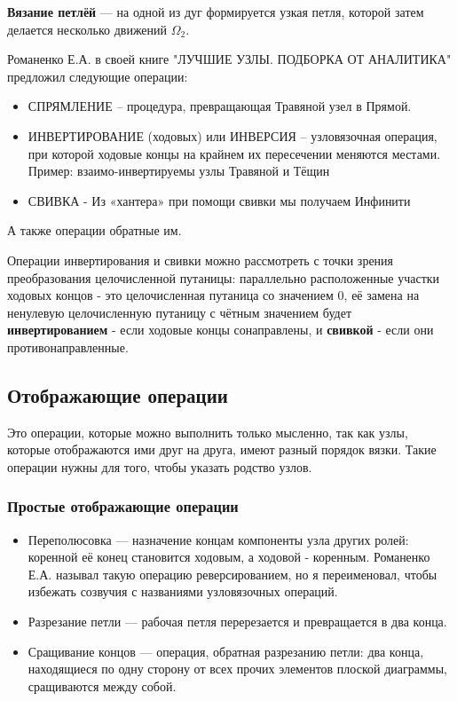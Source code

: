\textbf{Вязание петлёй} --- на одной из дуг формируется узкая петля, которой затем делается несколько движений $\Omega_2$.

Романенко Е.А. в своей книге "ЛУЧШИЕ УЗЛЫ. ПОДБОРКА ОТ АНАЛИТИКА" предложил следующие операции:
\begin{itemize}
\item СПРЯМЛЕНИЕ – процедура, превращающая Травяной узел в Прямой. 
\item ИНВЕРТИРОВАНИЕ (ходовых) или ИНВЕРСИЯ – узловязочная операция, при которой ходовые концы на крайнем их пересечении меняются местами. Пример: взаимо-инвертируемы узлы Травяной и Тёщин 
\item СВИВКА - Из «хантера» при помощи свивки мы получаем Инфинити
\end{itemize}
А также операции обратные им.


Операции инвертирования и свивки можно рассмотреть с точки зрения преобразования целочисленной путаницы: параллельно расположенные участки ходовых концов - это целочисленная путаница со значением 0, её замена на ненулевую целочисленную путаницу с чётным значением будет \textbf{инвертированием} - если ходовые концы сонаправлены, и \textbf{свивкой} - если они противонаправленные.

\subsection{Отображающие операции}

Это операции, которые можно выполнить только мысленно, так как узлы, которые отображаются ими друг на друга, имеют разный порядок вязки. Такие операции нужны для того, чтобы указать родство узлов.

\subsubsection{Простые отображающие операции}
\begin{itemize}
\item Переполюсовка --- назначение концам компоненты узла других ролей: коренной её конец становится ходовым, а ходовой - коренным. Романенко Е.А. называл такую операцию реверсированием, но я переименовал, чтобы избежать созвучия с названиями узловязочных операций.
\item Разрезание петли --- рабочая петля перерезается и превращается в два конца.
\item Сращивание концов --- операция, обратная разрезанию петли: два конца, находящиеся по одну сторону от всех прочих элементов плоской диаграммы, сращиваются между собой.
\end{itemize}

